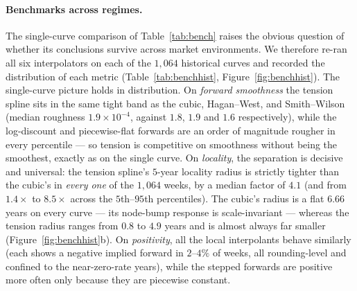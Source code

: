 \documentclass[]{interact}
\theoremstyle{plain}
\begin{document}
\paragraph{Benchmarks across regimes.} The single-curve comparison of Table~\ref{tab:bench}
raises the obvious question of whether its conclusions survive across market environments. We
therefore re-ran all six interpolators on each of the $1{,}064$ historical curves and recorded
the distribution of each metric (Table~\ref{tab:benchhist}, Figure~\ref{fig:benchhist}). The
single-curve picture holds in distribution. On \emph{forward smoothness} the tension spline sits
in the same tight band as the cubic, Hagan--West, and Smith--Wilson (median roughness
$1.9\times10^{-4}$, against $1.8$, $1.9$ and $1.6$ respectively), while the log-discount and
piecewise-flat forwards are an order of magnitude rougher in every percentile --- so tension is
competitive on smoothness without being the smoothest, exactly as on the single curve. On
\emph{locality}, the separation is decisive and universal: the tension spline's $5$-year
locality radius is strictly tighter than the cubic's in \emph{every one} of the $1{,}064$ weeks,
by a median factor of $4.1$ (and from $1.4\times$ to $8.5\times$ across the $5$th--$95$th
percentiles). The cubic's radius is a flat $6.66$ years on every curve --- its node-bump response
is scale-invariant --- whereas the tension radius ranges from $0.8$ to $4.9$ years and is almost
always far smaller (Figure~\ref{fig:benchhist}b). On \emph{positivity}, all the local
interpolants behave similarly (each shows a negative implied forward in $2$--$4\%$ of weeks, all
rounding-level and confined to the near-zero-rate years), while the stepped forwards are positive
more often only because they are piecewise constant.
\end{document}
